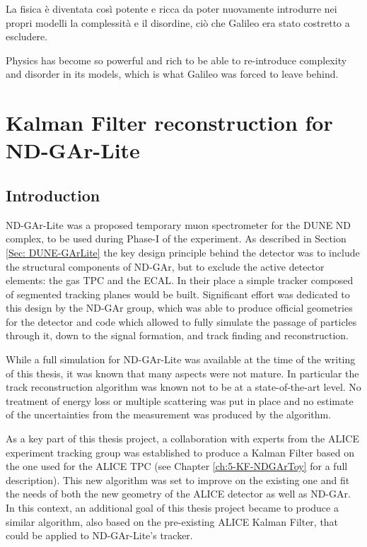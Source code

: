 \begin{savequote}[8cm]
La fisica è diventata così potente e ricca da poter nuovamente introdurre nei propri modelli la complessità e il disordine, ciò che Galileo era stato costretto a escludere.

Physics has become so powerful and rich to be able to re-introduce complexity and disorder in its models, which is what Galileo was forced to leave behind.
\end{savequote}


\chapter{\label{ch:4-KF-NDGArLite}Kalman Filter reconstruction for ND-GAr-Lite}
\minitoc

\section{Introduction}
ND-GAr-Lite was a proposed temporary muon spectrometer  for the DUNE ND complex, to be used during Phase-I of the experiment. As described in Section \ref{Sec: DUNE-GArLite} the key design principle behind the detector was to include the structural components of ND-GAr, but to exclude the active detector elements: the gas TPC and the ECAL. In their place a simple tracker composed of segmented tracking planes would be built. Significant effort was dedicated to this design by the ND-GAr group, which was able to produce official geometries for the detector and code which allowed to fully simulate the passage of particles through it, down to the signal formation, and track finding and reconstruction.

While a full simulation for ND-GAr-Lite was available at the time of the writing of this thesis, it was known that many aspects were not mature. In particular the track reconstruction algorithm was known not to be at a state-of-the-art level. No treatment of energy loss or multiple scattering was put in place and no estimate of the uncertainties from the measurement was produced by the algorithm.

As a key part of this thesis project, a collaboration with experts from the ALICE experiment tracking group was established to produce a Kalman Filter based on the one used for the ALICE TPC (see Chapter \ref{ch:5-KF-NDGArToy} for a full description). This new algorithm was set to improve on the existing one and fit the needs of both the new geometry of the ALICE detector as well as ND-GAr. In this context, an additional goal of this thesis project became to produce a similar algorithm, also based on the pre-existing ALICE Kalman Filter, that could be applied to ND-GAr-Lite's tracker. 

